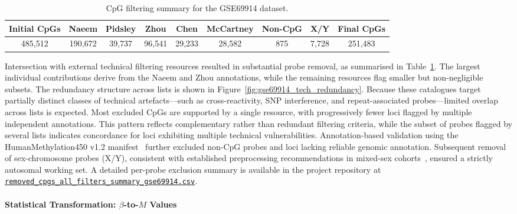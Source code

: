 \begin{table}[t]
\centering
\caption{CpG filtering summary for the GSE69914 dataset.}
\label{tab:gse69914_cpg_filtering}
\scriptsize
\begin{tabular}{c c c c c c c c c}
\toprule
Initial CpGs &
Naeem &
Pidsley &
Zhou &
Chen &
McCartney &
Non-CpG &
X/Y &
Final CpGs \\
\midrule
485{,}512 &
190{,}672 &
39{,}737 &
96{,}541 &
29{,}233 &
28{,}582 &
875 &
7{,}728 &
251{,}483 \\
\bottomrule
\end{tabular}
\end{table}

Intersection with external technical filtering resources resulted in substantial probe removal, as summarised in Table~\ref{tab:gse69914_cpg_filtering}. The largest individual contributions derive from the Naeem and Zhou annotations, while the remaining resources flag smaller but non-negligible subsets. The redundancy structure across lists is shown in Figure~\ref{fig:gse69914_tech_redundancy}.
Because these catalogues target partially distinct classes of technical artefacts—such as cross-reactivity, SNP interference, and repeat-associated probes—limited overlap across lists is expected. Most excluded CpGs are supported by a single resource, with progressively fewer loci flagged by multiple independent annotations. This pattern reflects complementary rather than redundant filtering criteria, while the subset of probes flagged by several lists indicates concordance for loci exhibiting multiple technical vulnerabilities.
Annotation-based validation using the HumanMethylation450 v1.2 manifest~\cite{Illumina450kManifest} further excluded non-CpG probes and loci lacking reliable genomic annotation. Subsequent removal of sex-chromosome probes (X/Y), consistent with established  preprocessing recommendations in mixed-sex cohorts~\cite{maksimovic2012, Wang2022InterpolatedXY}, ensured a strictly autosomal working set.
A detailed per-probe exclusion summary is available in the project repository at  
\href{https://github.com/elisabettaroviera/THESIS/blob/main/05%20-%20CpG%20list/Removed%20CpGs%20per%20Dataset/removed_cpgs_all_filters_summary_gse69914.csv}
{\texttt{removed\_cpgs\_all\_filters\_summary\_gse69914.csv}}.


\paragraph{Statistical Transformation: $\beta$-to-$M$ Values}
\label{par:gse69914_step4}

